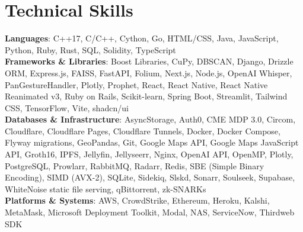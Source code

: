 \documentclass[letterpaper,11pt]{article}
\begin{document}
\section{Technical Skills}
 \begin{itemize}[leftmargin=0.15in, label={}]
    \small{\item{
\textbf{Languages}{: C++17, C/C++, Cython, Go, HTML/CSS, Java, JavaScript, Python, Ruby, Rust, SQL, Solidity, TypeScript} \\
\textbf{Frameworks \& Libraries}{: Boost Libraries, CuPy, DBSCAN, Django, Drizzle ORM, Express.js, FAISS, FastAPI, Folium, Next.js, Node.js, OpenAI Whisper, PanGestureHandler, Plotly, Prophet, React, React Native, React Native Reanimated v3, Ruby on Rails, Scikit-learn, Spring Boot, Streamlit, Tailwind CSS, TensorFlow, Vite, shadcn/ui} \\
\textbf{Databases \& Infrastructure}{: AsyncStorage, Auth0, CME MDP 3.0, Circom, Cloudflare, Cloudflare Pages, Cloudflare Tunnels, Docker, Docker Compose, Flyway migrations, GeoPandas, Git, Google Maps API, Google Maps JavaScript API, Groth16, IPFS, Jellyfin, Jellyseerr, Nginx, OpenAI API, OpenMP, Plotly, PostgreSQL, Prowlarr, RabbitMQ, Radarr, Redis, SBE (Simple Binary Encoding), SIMD (AVX-2), SQLite, Sidekiq, Slskd, Sonarr, Soulseek, Supabase, WhiteNoise static file serving, qBittorrent, zk-SNARKs} \\
\textbf{Platforms \& Systems}{: AWS, CrowdStrike, Ethereum, Heroku, Kalshi, MetaMask, Microsoft Deployment Toolkit, Modal, NAS, ServiceNow, Thirdweb SDK}
    }}
 \end{itemize}
\end{document}
